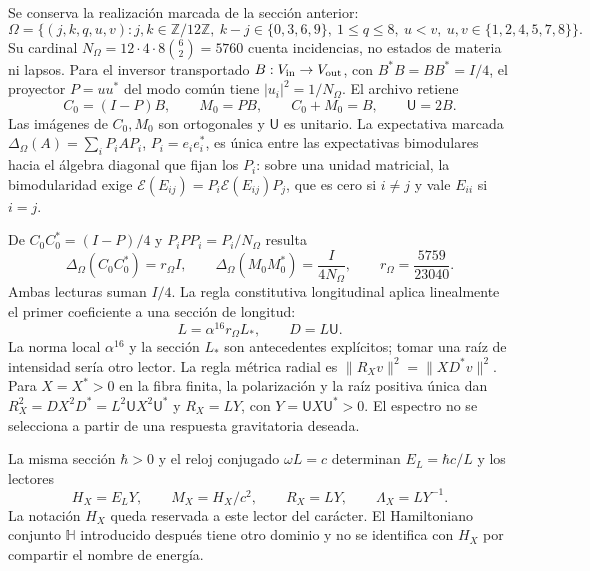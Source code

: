 Se conserva la realización marcada de la sección anterior:
\[
\Omega=\{(j,k,q,u,v):j,k\in\mathbb Z/12\mathbb Z,\ 
k-j\in\{0,3,6,9\},\ 1\leq q\leq8,\ 
u<v,\ u,v\in\{1,2,4,5,7,8\}\}.
\]
Su cardinal $N_\Omega=12\cdot4\cdot8\binom62=5760$ cuenta incidencias,
no estados de materia ni lapsos. Para el inversor transportado
$B:V_{\rm in}\to V_{\rm out}$, con $B^*B=BB^*=I/4$, el proyector
$P=uu^*$ del modo común tiene $|u_i|^2=1/N_\Omega$. El archivo retiene
\[
C_0=(I-P)B,\qquad M_0=PB,\qquad C_0+M_0=B,\qquad\mathsf U=2B.
\]
Las imágenes de $C_0,M_0$ son ortogonales y $\mathsf U$ es unitario.
La expectativa marcada $\Delta_\Omega(A)=\sum_iP_iAP_i$,
$P_i=e_ie_i^*$, es única entre las expectativas bimodulares hacia
el álgebra diagonal que fijan los $P_i$: sobre una unidad matricial,
la bimodularidad exige
$\mathcal E(E_{ij})=P_i\mathcal E(E_{ij})P_j$, que es cero si $i\ne j$
y vale $E_{ii}$ si $i=j$.

De $C_0C_0^*=(I-P)/4$ y $P_iPP_i=P_i/N_\Omega$ resulta
\begin{equation}
\Delta_\Omega(C_0C_0^*)=r_\Omega I,\qquad
\Delta_\Omega(M_0M_0^*)=\frac{I}{4N_\Omega},\qquad
r_\Omega=\frac{5759}{23040}.
\label{hmtcuatro:gea:retorno}
\end{equation}
Ambas lecturas suman $I/4$. La regla constitutiva longitudinal aplica
linealmente el primer coeficiente a una sección de longitud:
\begin{equation}
L=\alpha^{16}r_\Omega L_*,\qquad D=L\mathsf U.
\label{hmtcuatro:gea:longitud}
\end{equation}
La norma local $\alpha^{16}$ y la sección $L_*$ son antecedentes
explícitos; tomar una raíz de intensidad sería otro lector.
La regla métrica radial es $\|R_Xv\|^2=\|XD^*v\|^2$.
Para $X=X^*>0$ en la fibra finita, la polarización y la raíz positiva
única dan $R_X^2=DX^2D^*=L^2\mathsf UX^2\mathsf U^*$ y
$R_X=LY$, con $Y=\mathsf UX\mathsf U^*>0$.
El espectro no se selecciona a partir de una respuesta gravitatoria deseada.

La misma sección $\hbar>0$ y el reloj conjugado $\omega L=c$
determinan $E_L=\hbar c/L$ y los lectores
\begin{equation}
H_X=E_LY,\qquad M_X=H_X/c^2,\qquad
R_X=LY,\qquad\Lambda_X=LY^{-1}.
\label{hmtcuatro:gea:lectores}
\end{equation}
La notación $H_X$ queda reservada a este lector del carácter.
El Hamiltoniano conjunto $\mathbb H$ introducido después tiene otro
dominio y no se identifica con $H_X$ por compartir el nombre de energía.


